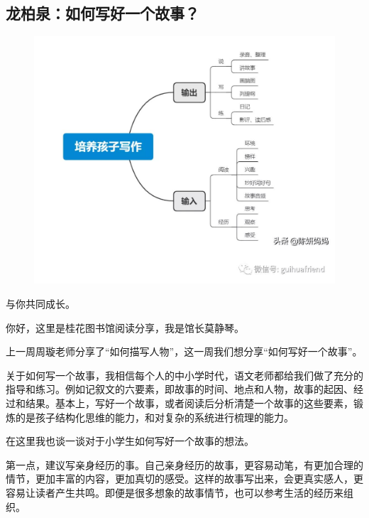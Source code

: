 \vspace{10pt}

{\centering\subsection*{龙柏泉：如何写好一个故事？}}


\renewcommand{\leftmark}{龙柏泉：如何写好一个故事？}

\begin{figure}[htbp]

\centering

\includegraphics[width = .5\textwidth]{./ch/v6.jpg}

\end{figure}

与你共同成长。



你好，这里是桂花图书馆阅读分享，我是馆长莫静琴。



上一周周璇老师分享了“如何描写人物”，这一周我们想分享“如何写好一个故事”。



关于如何写一个故事，我相信每个人的中小学时代，语文老师都给我们做了充分的指导和练习。例如记叙文的六要素，即故事的时间、地点和人物，故事的起因、经过和结果。基本上，写好一个故事，或者阅读后分析清楚一个故事的这些要素，锻炼的是孩子结构化思维的能力，和对复杂的系统进行梳理的能力。





在这里我也谈一谈对于小学生如何写好一个故事的想法。



第一点，建议写亲身经历的事。自己亲身经历的故事，更容易动笔，有更加合理的情节，更加丰富的内容，更加真切的感受。这样的故事写出来，会更真实感人，更容易让读者产生共鸣。即便是很多想象的故事情节，也可以参考生活的经历来组织。



